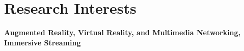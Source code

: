 
\section{Research Interests}
{\bf Augmented Reality, Virtual Reality, and Multimedia Networking, Immersive Streaming}
